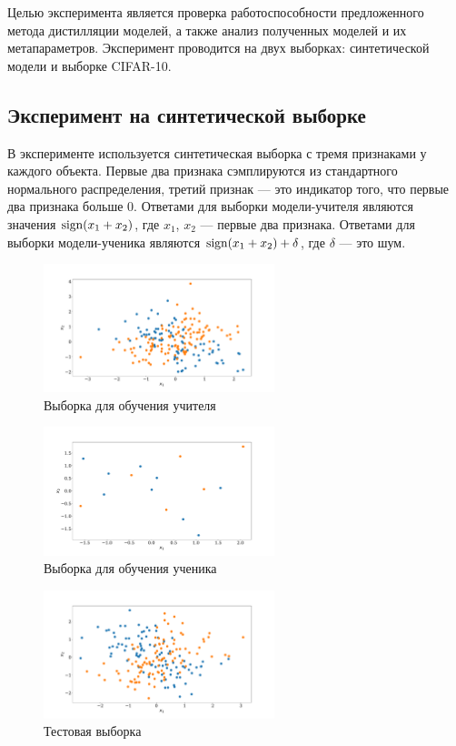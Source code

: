 \documentclass[12pt, twoside]{article}
\begin{document}
Целью эксперимента является проверка работоспособности предложенного метода дистилляции моделей, а также анализ полученных моделей и их метапараметров. Эксперимент проводится на двух выборках: синтетической модели и выборке CIFAR-10.

\subsection{Эксперимент на синтетической выборке}

В эксперименте используется синтетическая выборка с тремя признаками у каждого объекта. Первые два признака сэмплируются из  стандартного нормального распределения, третий признак --- это индикатор того, что первые два признака больше 0. Ответами для выборки модели-учителя являются значения $\sign(x_1+x_2)$, где $x_1$, $x_2$ --- первые два признака. Ответами для выборки модели-ученика являются $\sign(x_1+x_2)+\delta$, где $\delta$ --- это шум.

\begin{figure}[!ht]
    \centering
    \includegraphics[width=0.6\textwidth]{ttrain.pdf}
    \caption{Выборка для обучения учителя}
    \label{fig:ttrain}
\end{figure}

\begin{figure}[!ht]
    \centering
    \includegraphics[width=0.6\textwidth]{train.pdf}
    \caption{Выборка для обучения ученика}
    \label{fig:train}
\end{figure}

\begin{figure}[!ht]
    \centering
    \includegraphics[width=0.6\textwidth]{test.pdf}
    \caption{Тестовая выборка}
    \label{fig:test}
\end{figure}
\end{document}
